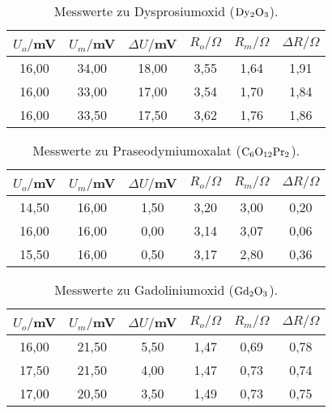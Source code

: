 \begin{table}[htp]
	\begin{center}
    \caption{Messwerte zu Dysprosiumoxid ($\ce{Dy2O3}$).}
    \label{tab:dysprosium}
		\begin{tabular}{cccccc}
			\toprule
						{$U_o/$mV} & {$U_m/$mV} & {$\Delta U/$mV} & {$R_o/\Omega$} & {$R_m/\Omega$} & {$\Delta R/\Omega$}\\
						\midrule
						16,00 & 34,00 & 18,00 & 3,55 & 1,64 & 1,91\\
						16,00 & 33,00 & 17,00 & 3,54 & 1,70 & 1,84\\
						16,00 & 33,50 & 17,50 & 3,62 & 1,76 & 1,86\\
					\bottomrule
		\end{tabular}
	\end{center}
\end{table}


\begin{table}[htp]
	\begin{center}
    \caption{Messwerte zu Praseodymiumoxalat ($\ce{C6O12Pr2}$).}
    \label{tab:seodynumoxid}
		\begin{tabular}{cccccc}
			\toprule
				{$U_o/$mV} & {$U_m/$mV} & {$\Delta U/$mV} & {$R_o/\Omega$} & {$R_m/\Omega$} & {$\Delta R/\Omega$}\\
				\midrule
				14,50 & 16,00 & 1,50 & 3,20 & 3,00 & 0,20\\
				16,00 & 16,00 & 0,00 & 3,14 & 3,07 & 0,06\\
				15,50 & 16,00 & 0,50 & 3,17 & 2,80 & 0,36\\
			\bottomrule
		\end{tabular}
	\end{center}
\end{table}


\begin{table}[htp]
	\begin{center}
    \caption{Messwerte zu Gadoliniumoxid ($\ce{Gd2O3}$).}
    \label{tab:gadolinium}
		\begin{tabular}{cccccc}
			\toprule
				{$U_o/$mV} & {$U_m/$mV} & {$\Delta U/$mV} & {$R_o/\Omega$} & {$R_m/\Omega$} & {$\Delta R/\Omega$}\\
				\midrule
				16,00 & 21,50 & 5,50 & 1,47 & 0,69 & 0,78\\
				17,50 & 21,50 & 4,00 & 1,47 & 0,73 & 0,74\\
				17,00 & 20,50 & 3,50 & 1,49 & 0,73 & 0,75\\
			\bottomrule
		\end{tabular}
	\end{center}
\end{table}



